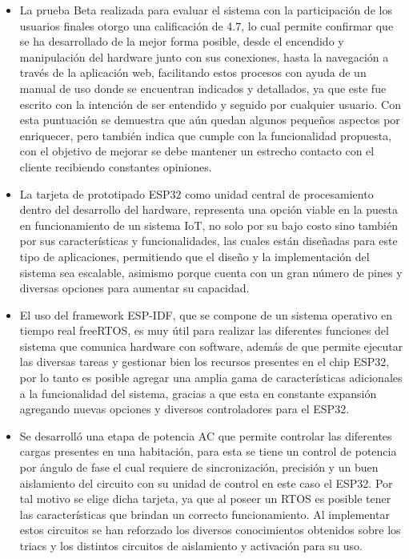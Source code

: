 \begin{itemize}
	\item La prueba Beta realizada para evaluar el sistema con la participación de los usuarios finales otorgo una calificación de 4.7, lo cual permite confirmar que se ha desarrollado de la mejor forma posible, desde el encendido y manipulación del hardware junto con sus conexiones, hasta la navegación a través de la aplicación web, facilitando estos procesos con ayuda de un manual de uso donde se encuentran indicados y detallados, ya que este fue escrito con la intención de ser entendido y seguido por cualquier usuario. Con esta puntuación se demuestra que aún quedan algunos pequeños aspectos por enriquecer, pero también indica que cumple con la funcionalidad propuesta, con el objetivo de mejorar se debe mantener un estrecho contacto con el cliente recibiendo constantes opiniones.\\
	
	\item La tarjeta de prototipado ESP32 como unidad central de procesamiento dentro del desarrollo del hardware, representa una opción viable en la puesta en funcionamiento de un sistema IoT, no solo por su bajo costo sino también por sus características y funcionalidades, las cuales están diseñadas para este tipo de aplicaciones, permitiendo que el diseño y la implementación del sistema sea escalable, asimismo porque cuenta con un gran número de pines y diversas opciones para aumentar su capacidad.\\
	
	\item El uso del framework ESP-IDF, que se compone de un sistema operativo en tiempo real freeRTOS, es muy útil para realizar las diferentes funciones del sistema que comunica hardware con software, además de que permite ejecutar las diversas tareas y gestionar bien los recursos presentes en el chip ESP32, por lo tanto es posible agregar una amplia gama de características adicionales a la funcionalidad del sistema, gracias a que esta en constante expansión agregando nuevas opciones y diversos controladores para el ESP32.\\
	
	\item Se desarrolló una etapa de potencia AC que permite controlar las diferentes cargas presentes en una habitación, para esta se tiene un control de potencia por ángulo de fase el cual requiere de sincronización, precisión y un buen aislamiento del circuito con su unidad de control en este caso el ESP32. Por tal motivo se elige dicha tarjeta, ya que al poseer un RTOS es posible tener las características que brindan un correcto funcionamiento. Al implementar estos circuitos se han reforzado los diversos conocimientos obtenidos sobre los triacs y los distintos circuitos de aislamiento y activación para su uso.\\
	
\end{itemize}